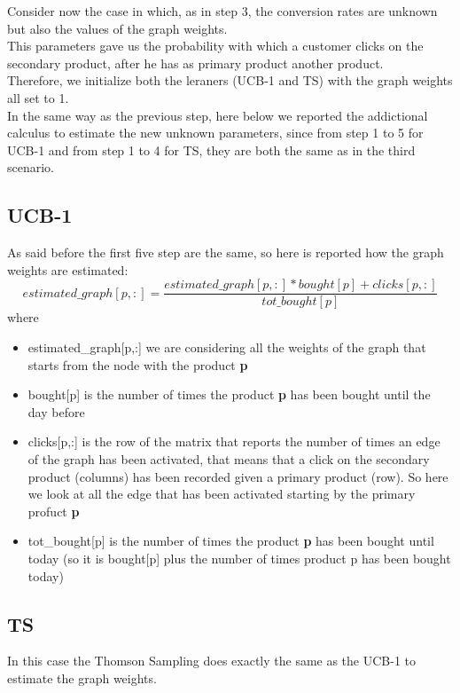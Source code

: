 Consider now the case in which, as in step 3, the conversion rates are unknown but also the values of the graph weights.\\ This parameters gave us the probability with which a customer clicks on the secondary product, after he has as primary product another product.\\ Therefore, we initialize both the leraners (UCB-1 and TS) with the graph weights all set to 1.\\ 
In the same way as the previous step, here below we reported the addictional calculus to estimate the new unknown parameters, since from step 1 to 5 for UCB-1 and from step 1 to 4 for TS, they are both the same as in the third scenario.

\subsection{UCB-1}
As said before the first five step are the same, so here is reported how the graph weights are estimated:
\begin{equation}
    estimated\_graph[p,:] = \frac{estimated\_graph[p,:] * bought[p] + clicks[p,:]}{tot\_bought[p]}
\end{equation}where \begin{itemize}
    \item estimated\_graph[p,:] we are considering all the weights of the graph that starts from the node with the product {\bf p}
    \item bought[p] is the number of times the product {\bf p} has been bought until the day before
    \item clicks[p,:] is the row of the matrix that reports the number of times an edge of the graph has been activated, that means that a click on the secondary product (columns) has been recorded given a primary product (row). So here we look at all the edge that has been activated starting by the primary profuct {\bf p}
    \item tot\_bought[p] is the number of times the product {\bf p} has been bought until today (so it is bought[p] plus the number of times product p has been bought today)
\end{itemize}
\subsection{TS}
In this case the Thomson Sampling does exactly the same as the UCB-1 to estimate the graph weights.
